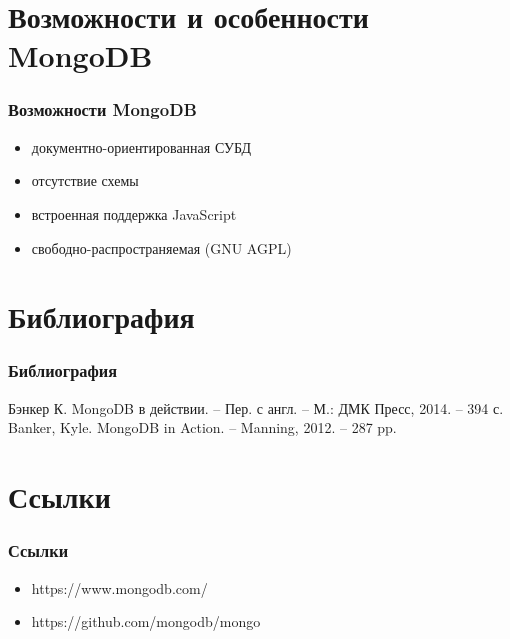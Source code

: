 \documentclass[11pt]{beamer}
\begin{document}
\section{Возможности и особенности MongoDB}

\begin{frame}
\frametitle{Возможности MongoDB}
\begin{itemize}
	\item документно-ориентированная СУБД
	\item отсутствие схемы
	\item встроенная поддержка JavaScript
	\item свободно-распространяемая (GNU AGPL)
\end{itemize}
\end{frame}

\section{Библиография}

\begin{frame}
\frametitle{Библиография}
\begin{thebibliography}{1}
   Бэнкер К. MongoDB в действии. -- Пер. с англ. -- 
  М.: ДМК Пресс, 2014. -- 394 с.
   Banker, Kyle. MongoDB in Action. -- Manning, 2012. 
  -- 287 pp.
\end{thebibliography}
\end{frame}

\section{Ссылки}

\begin{frame}
\frametitle{Ссылки}
\begin{itemize}
	\item https://www.mongodb.com/
	\item https://github.com/mongodb/mongo
\end{itemize}
\end{frame}
\end{document}
